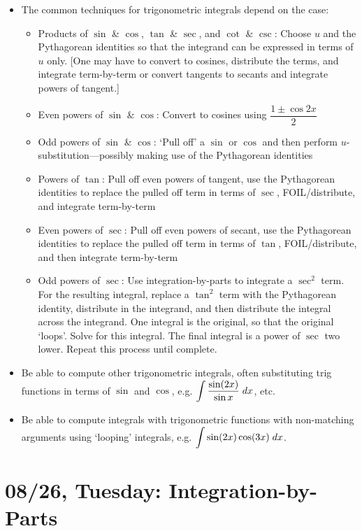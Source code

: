 \documentclass[11pt,letterpaper]{article}
\begin{document}
\begin{itemize}
\item The common techniques for trigonometric integrals depend on the case:
	\begin{itemize}
	\item Products of $\sin$ \& $\cos$, $\tan$ \& $\sec$, and $\cot$ \& $\csc$: Choose $u$ and the Pythagorean identities so that the integrand can be expressed in terms of $u$ only. [One may have to convert to cosines, distribute the terms, and integrate term-by-term or convert tangents to secants and integrate powers of tangent.]
	\item Even powers of $\sin$ \& $\cos$: Convert to cosines using $\dfrac{1 \pm \cos 2x}{2}$
	\item Odd powers of $\sin$ \& $\cos$: `Pull off' a $\sin$ or $\cos$ and then perform $u$-substitution---possibly making use of the Pythagorean identities
	\item Powers of $\tan$: Pull off even powers of tangent, use the Pythagorean identities to replace the pulled off term in terms of $\sec$, FOIL/distribute, and integrate term-by-term
	\item Even powers of $\sec$: Pull off even powers of secant, use the Pythagorean identities to replace the pulled off term in terms of $\tan$, FOIL/distribute, and then integrate term-by-term
	\item Odd powers of $\sec$: Use integration-by-parts to integrate a $\sec^2$ term. For the resulting integral, replace a $\tan^2$ term with the Pythagorean identity, distribute in the integrand, and then distribute the integral across the integrand. One integral is the original, so that the original `loops'. Solve for this integral. The final integral is a power of $\sec$ two lower. Repeat this process until complete.
	\end{itemize}

\item Be able to compute other trigonometric integrals, often substituting trig functions in terms of $\sin$ and $\cos$, e.g. $\displaystyle\int \dfrac{\sin(2x)}{\sin x} \;dx$, etc.

\item Be able to compute integrals with trigonometric functions with non-matching arguments using `looping' integrals, e.g. $\displaystyle\int \sin(2x) \cos(3x) \;dx$. 
\end{itemize}

\newpage
\section*{08/26, Tuesday: Integration-by-Parts\label{08-26}}
\end{document}
